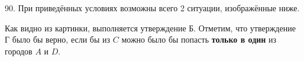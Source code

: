 90. При приведённых условиях возможны всего 2 ситуации, изображённые ниже.
\begin{center}
\begin{figure}[ht!]
\end{figure}
\end{center}
Как видно из картинки, выполняется утверждение Б. Отметим, что утверждение Г было бы верно, если бы из $C$ можно было бы попасть {\bf только в один} из городов $A$ и $D.$\\
